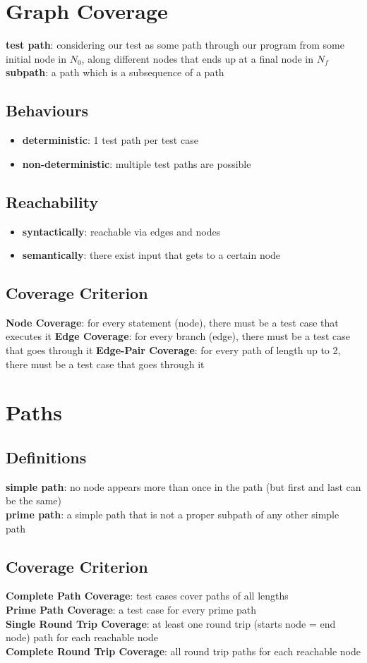 \documentclass[]{article}
\theoremstyle{definition}
\begin{document}
	\section{Graph Coverage}
		\textbf{test path}: considering our test as some path through our program from some initial node in $N_0$, along different nodes that ends up at a final node in $N_f$ \\
		\textbf{subpath}: a path which is a subsequence of a path
		\subsection{Behaviours}
			\begin{itemize}	
				\item \textbf{deterministic}: 	1 test path per test case
				\item \textbf{non-deterministic}: 	multiple test paths are possible
			\end{itemize}
		\subsection{Reachability}
			\begin{itemize}
				\item \textbf{syntactically}:	reachable via edges and nodes
				\item \textbf{semantically}:	there exist input that gets to a certain node
			\end{itemize}
		\subsection{Coverage Criterion}
			\textbf{Node Coverage}: for every statement (node), there must be a test case that executes it
			\textbf{Edge Coverage}: for every branch (edge), there must be a test case that goes through it
			\textbf{Edge-Pair Coverage}: for every path of length up to 2, there must be a test case that goes through it
	\section{Paths}
		\subsection{Definitions}
			\textbf{simple path}: no node appears more than once in the path (but first and last can be the same) \\
			\textbf{prime path}: a simple path that is not a proper subpath of any other simple path
		\subsection{Coverage Criterion}
			\textbf{Complete Path Coverage}: test cases cover paths of all lengths \\
			\textbf{Prime Path Coverage}: a test case for every prime path \\
			\textbf{Single Round Trip Coverage}: at least one round trip (starts node = end node) path for each reachable node \\
			\textbf{Complete Round Trip Coverage}: all round trip paths for each reachable node\\
\end{document}
